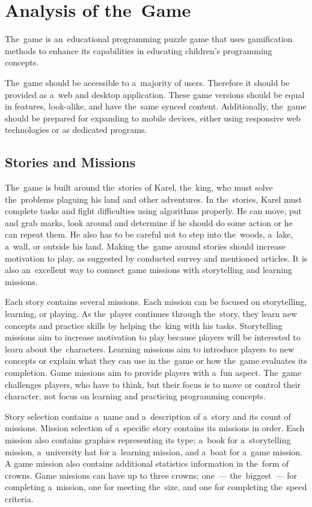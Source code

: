 \section{Analysis of the~Game}
\label{analysis:game}

The~game \emph{\myAppName} is an~educational programming puzzle game that uses gamification methods to enhance its capabilities in educating children's programming concepts.

The~game should be accessible to a~majority of users.
Therefore it should be provided as a~web and desktop application.
These game versions should be equal in features, look-alike, and have the~same synced content.
Additionally, the~game should be prepared for expanding to mobile devices, either using responsive web technologies or as dedicated programs.

\subsection{Stories and Missions}
\label{analysis:game:stories-and-missions}

The~game is built around the~stories of Karel, the~king, who must solve the~problems plaguing his land and other adventures.
In the~stories, Karel must complete tasks and fight difficulties using algorithms properly.
He can move, put and grab marks, look around and determine if he should do some action or he can repeat them.
He also has to be careful not to step into the~woods, a~lake, a~wall, or outside his land.
Making the~game around \mbox{stories} should increase motivation to play, as suggested by conducted survey and mentioned articles.
It is also an~excellent way to connect game missions with storytelling and learning missions.

Each story contains several missions.
Each mission can be focused on storytelling, learning, or playing.
As the~player continues through the~story, they learn new concepts and practice skills by helping the~king with his tasks.
Storytelling missions aim to increase motivation to play because players will be interested to learn about the~characters.
Learning missions aim to introduce players to new concepts or explain what they can use in the~game or how the~game evaluates its completion.
Game missions aim to provide players with a~fun aspect.
The~game challenges players, who have to think, but their focus is to move or control their character, not focus on learning and practicing programming concepts.

Story selection contains a~name and a~description of a~story and its count of missions.
Mission selection of a~specific story contains its missions in \mbox{order}.
Each mission also contains graphics representing its type; a~book for a~storytelling mission, a~university hat for a~learning mission, and a~boat for a~game mission.
A game mission also contains additional statistics information in the~form of crowns.
Game missions can have up to three crowns; one~--- the~biggest~--- for completing a~mission, one for meeting the~size, and one for completing the~speed criteria.

